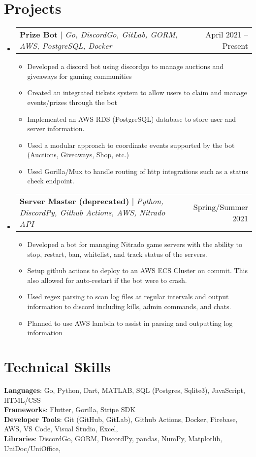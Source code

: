 \documentclass[letterpaper,11pt]{article}
\makeatletter
\newcommand{\resumeItem}[1]{
  \item\small{
    {#1 \vspace{-2pt}}
  }
}
\newcommand{\resumeProjectHeading}[2]{
    \item
    \begin{tabular*}{0.97\textwidth}{l@{\extracolsep{\fill}}r}
      \small#1 & #2 \\
    \end{tabular*}\vspace{-7pt}
}
\newcommand{\resumeSubHeadingListStart}{\begin{itemize}[leftmargin=0.15in, label={}]}
\newcommand{\resumeSubHeadingListEnd}{\end{itemize}}
\newcommand{\resumeItemListStart}{\begin{itemize}}
\newcommand{\resumeItemListEnd}{\end{itemize}\vspace{-5pt}}
\makeatother
\begin{document}
\section{Projects}
    \resumeSubHeadingListStart
      \resumeProjectHeading
          {\textbf{Prize Bot} $|$ \emph{Go, DiscordGo, GitLab, GORM, AWS, PostgreSQL, Docker}}{April 2021 -- Present}
          \resumeItemListStart
            \resumeItem{Developed a discord bot using discordgo to manage auctions and giveaways for gaming communities}
            \resumeItem{Created an integrated tickets system to allow users to claim and manage events/prizes through the bot}
            \resumeItem{Implemented an AWS RDS (PostgreSQL) database to store user and server information. }
            \resumeItem{Used a modular approach to coordinate events supported by the bot (Auctions, Giveaways, Shop, etc.)}
            \resumeItem{Used Gorilla/Mux to handle routing of http integrations such as a status check endpoint.}
          \resumeItemListEnd
      \resumeProjectHeading
          {\textbf{Server Master (deprecated)} $|$ \emph{Python, DiscordPy, Github Actions, AWS, Nitrado API}}{Spring/Summer 2021}
          \resumeItemListStart
            \resumeItem{Developed a bot for managing Nitrado game servers with the ability to stop, restart, ban, whitelist, and track status of the servers.}
            \resumeItem{Setup github actions to deploy to an AWS ECS Cluster on commit. This also allowed for auto-restart if the bot were to crash.}
            \resumeItem{Used regex parsing to scan log files at regular intervals and output information to discord including kills, admin commands, and chats.}
            \resumeItem{Planned to use AWS lambda to assist in parsing and outputting log information}
          \resumeItemListEnd
      
    \resumeSubHeadingListEnd



%
\section{Technical Skills}
 \begin{itemize}[leftmargin=0.15in, label={}]
    \small{\item{
     \textbf{Languages}{: Go, Python, Dart, MATLAB, SQL (Postgres, Sqlite3), JavaScript, HTML/CSS} \\
     \textbf{Frameworks}{: Flutter, Gorilla, Stripe SDK} \\
     \textbf{Developer Tools}{: Git (GitHub, GitLab), Github Actions, Docker, Firebase, AWS, VS Code, Visual Studio, Excel,} \\
     \textbf{Libraries}{: DiscordGo, GORM, DiscordPy, pandas, NumPy, Matplotlib, UniDoc/UniOffice, } \\
    }}
 \end{itemize}


\end{document}
